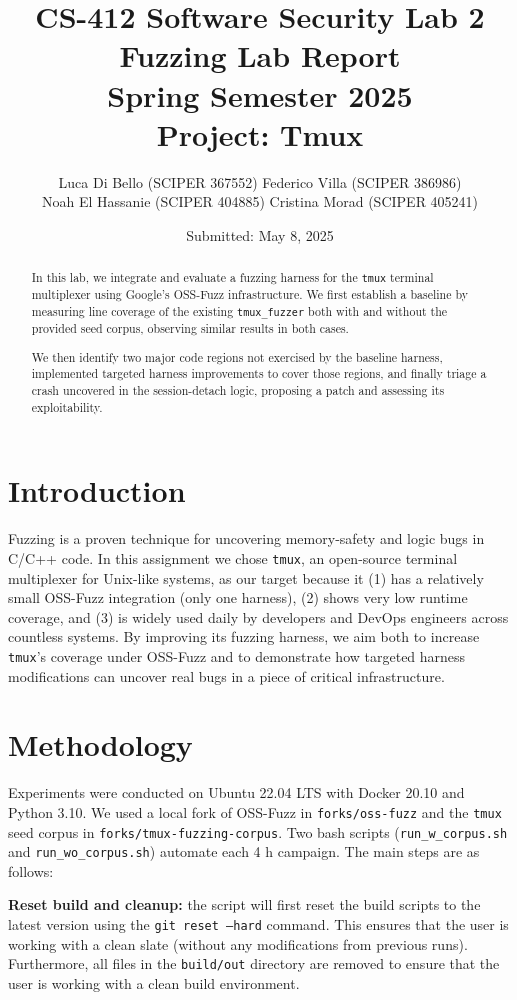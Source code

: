 \documentclass[11pt,a4paper,twocolumn]{article}
\title{%
  CS-412 Software Security Lab 2\\[0.5em]
  \Large Fuzzing Lab Report\\
  Spring Semester 2025\\[0.5em]
  Project: Tmux
}
\author{%
  Luca Di Bello (SCIPER 367552)
  Federico Villa (SCIPER 386986) \\
  Noah El Hassanie (SCIPER 404885)
  Cristina Morad (SCIPER 405241) \\
}
\date{Submitted: May 8, 2025}
\begin{document}
\maketitle

\begin{abstract}
	In this lab, we integrate and evaluate a fuzzing harness for the \texttt{tmux} terminal
	multiplexer using Google’s OSS-Fuzz infrastructure. We first establish a baseline
	by measuring line coverage of the existing \texttt{tmux\_fuzzer} both with and without the
	provided seed corpus, observing similar results in both cases.

	We then identify two major code regions not exercised by the baseline harness, implemented
	targeted harness improvements to cover those regions, and finally triage a crash uncovered
	in the session-detach logic, proposing a patch and assessing its exploitability.
\end{abstract}

\section{Introduction}

Fuzzing is a proven technique for uncovering memory‐safety and logic bugs in C/C++ code. In this assignment we chose \texttt{tmux}, an open-source terminal multiplexer for Unix-like systems, as our target because it (1) has a relatively small OSS-Fuzz integration (only one harness), (2) shows very low runtime coverage, and (3) is widely used daily by developers and DevOps engineers across countless systems.  By improving its fuzzing harness, we aim both to increase \texttt{tmux}’s coverage under OSS-Fuzz and to demonstrate how targeted harness modifications can uncover real bugs in a piece of critical infrastructure.

\section{Methodology}

Experiments were conducted on Ubuntu 22.04 LTS with Docker 20.10 and Python 3.10. We used a local fork of OSS-Fuzz in \texttt{forks/oss-fuzz} and the \texttt{tmux} seed corpus in \texttt{forks/tmux-fuzzing-corpus}. Two bash scripts (\texttt{run\_w\_corpus.sh} and \texttt{run\_wo\_corpus.sh}) automate each 4 h campaign. The main steps are as follows:

\textbf{Reset build and cleanup:} the script will first reset the build scripts to the latest version using the \texttt{git reset ---hard} command. This ensures that the user is working with a clean slate (without any modifications from previous runs). Furthermore, all files in the \texttt{build/out} directory are removed to ensure that the user is working with a clean build environment.
\end{document}
